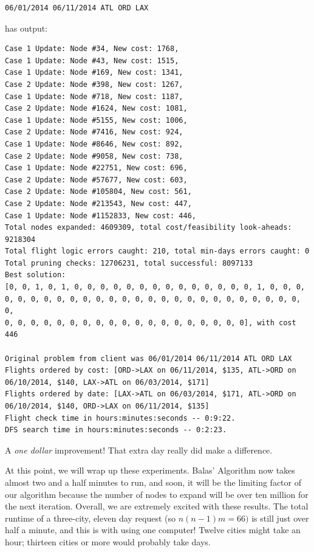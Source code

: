 \documentclass{article}
\begin{document}
\begin{verbatim}
06/01/2014 06/11/2014 ATL ORD LAX
\end{verbatim}

has output:

\scriptsize
\begin{verbatim}
Case 1 Update: Node #34, New cost: 1768, 
Case 1 Update: Node #43, New cost: 1515, 
Case 1 Update: Node #169, New cost: 1341, 
Case 2 Update: Node #398, New cost: 1267, 
Case 1 Update: Node #718, New cost: 1187, 
Case 2 Update: Node #1624, New cost: 1081, 
Case 1 Update: Node #5155, New cost: 1006, 
Case 2 Update: Node #7416, New cost: 924, 
Case 1 Update: Node #8646, New cost: 892, 
Case 2 Update: Node #9058, New cost: 738, 
Case 1 Update: Node #22751, New cost: 696, 
Case 2 Update: Node #57677, New cost: 603, 
Case 2 Update: Node #105804, New cost: 561, 
Case 2 Update: Node #213543, New cost: 447, 
Case 1 Update: Node #1152833, New cost: 446, 
Total nodes expanded: 4609309, total cost/feasibility look-aheads: 9218304
Total flight logic errors caught: 210, total min-days errors caught: 0
Total pruning checks: 12706231, total successful: 8097133
Best solution:
[0, 0, 1, 0, 1, 0, 0, 0, 0, 0, 0, 0, 0, 0, 0, 0, 0, 0, 0, 1, 0, 0, 0,
0, 0, 0, 0, 0, 0, 0, 0, 0, 0, 0, 0, 0, 0, 0, 0, 0, 0, 0, 0, 0, 0, 0, 0,
0, 0, 0, 0, 0, 0, 0, 0, 0, 0, 0, 0, 0, 0, 0, 0, 0, 0, 0], with cost 446

Original problem from client was 06/01/2014 06/11/2014 ATL ORD LAX
Flights ordered by cost: [ORD->LAX on 06/11/2014, $135, ATL->ORD on 06/10/2014, $140, LAX->ATL on 06/03/2014, $171]
Flights ordered by date: [LAX->ATL on 06/03/2014, $171, ATL->ORD on 06/10/2014, $140, ORD->LAX on 06/11/2014, $135]
Flight check time in hours:minutes:seconds -- 0:9:22.
DFS search time in hours:minutes:seconds -- 0:2:23.
\end{verbatim}
\normalsize

A \emph{one dollar} improvement! That extra day really did make a difference.

At this point, we will wrap up these experiments. Balas' Algorithm now takes almost two and a half minutes to run, and soon, it will be the limiting
factor of our algorithm because the number of nodes to expand will be over ten million for the next iteration. Overall, we are extremely excited with
these results.  The total runtime of a three-city, eleven day request (so $n(n-1)m = 66)$ is still just over half a minute, and this is with using one
computer! Twelve cities might take an hour; thirteen cities or more would probably take days.
\end{document}
